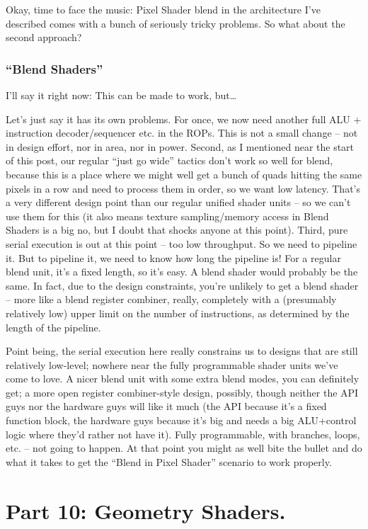 \documentclass[12pt]{article}
\begin{document}
Okay, time to face the music: Pixel Shader blend in the architecture I’ve described comes with a bunch of seriously tricky problems. So what about the second approach?

\subsubsection{“Blend Shaders”}
\label{sec:org7c07c4e}

I’ll say it right now: This can be made to work, but…

Let’s just say it has its own problems. For once, we now need another full ALU + instruction decoder/sequencer etc. in the ROPs. This is not a small change – not in design effort, nor in area, nor in power. Second, as I mentioned near the start of this post, our regular “just go wide” tactics don’t work so well for blend, because this is a place where we might well get a bunch of quads hitting the same pixels in a row and need to process them in order, so we want low latency. That’s a very different design point than our regular unified shader units – so we can’t use them for this (it also means texture sampling/memory access in Blend Shaders is a big no, but I doubt that shocks anyone at this point). Third, pure serial execution is out at this point – too low throughput. So we need to pipeline it. But to pipeline it, we need to know how long the pipeline is! For a regular blend unit, it’s a fixed length, so it’s easy. A blend shader would probably be the same. In fact, due to the design constraints, you’re unlikely to get a blend shader – more like a blend register combiner, really, completely with a (presumably relatively low) upper limit on the number of instructions, as determined by the length of the pipeline.

Point being, the serial execution here really constrains us to designs that are still relatively low-level; nowhere near the fully programmable shader units we’ve come to love. A nicer blend unit with some extra blend modes, you can definitely get; a more open register combiner-style design, possibly, though neither the API guys nor the hardware guys will like it much (the API because it’s a fixed function block, the hardware guys because it’s big and needs a big ALU+control logic where they’d rather not have it). Fully programmable, with branches, loops, etc. – not going to happen. At that point you might as well bite the bullet and do what it takes to get the “Blend in Pixel Shader” scenario to work properly.

\section{Part 10: Geometry Shaders.}
\label{sec:org17b4dc7}
\label{part10}
\end{document}
